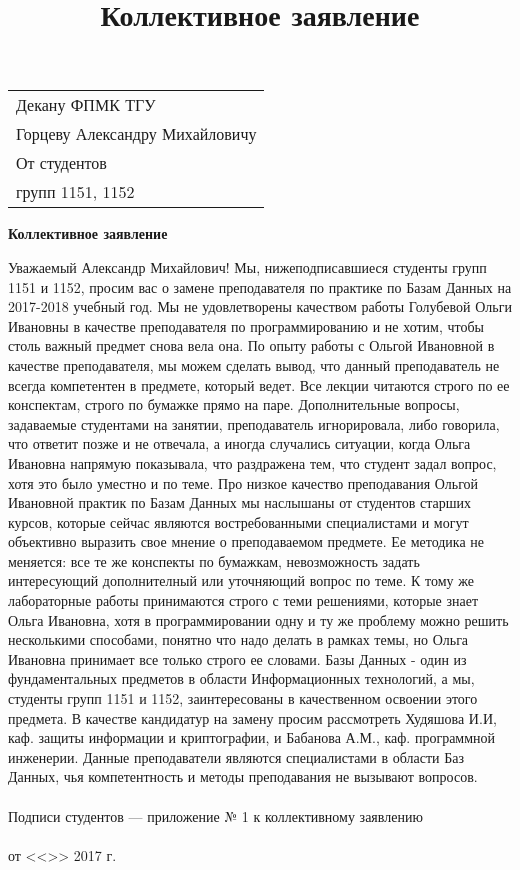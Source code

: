 \documentclass[a4paper,12pt]{extarticle}
\title{Коллективное заявление}
\begin{document}
	\pagestyle{empty}

	\begin{flushright}
		\begin{tabular}{l}
			Декану ФПМК ТГУ \\
			Горцеву Александру Михайловичу \\
			От студентов \\
			групп 1151, 1152
		\end{tabular}
	\end{flushright}


	\vspace{3cm}

	\centerline{\large \bf Коллективное заявление}

	\vspace{1cm}	

	Уважаемый Александр Михайлович!
	Мы, нижеподписавшиеся студенты групп 1151 и 1152, просим вас о замене преподавателя по практике по Базам Данных на 2017-2018 учебный год. Мы не удовлетворены качеством работы Голубевой Ольги Ивановны в качестве преподавателя по программированию и не хотим, чтобы столь важный предмет снова вела она. По опыту работы с Ольгой Ивановной в качестве преподавателя, мы можем сделать вывод, что данный преподаватель не всегда компетентен в предмете, который ведет. Все лекции читаются строго по ее конспектам, строго по бумажке прямо на паре. Дополнительные вопросы, задаваемые студентами на занятии, преподаватель игнорировала, либо говорила, что ответит позже и не отвечала, а иногда случались ситуации, когда Ольга Ивановна напрямую показывала, что раздражена тем, что студент задал вопрос, хотя это было уместно и по теме. Про низкое качество преподавания Ольгой Ивановной практик по Базам Данных мы наслышаны от студентов старших курсов, которые сейчас являются востребованными специалистами и могут объективно выразить свое мнение о преподаваемом предмете. Ее методика не меняется: все те же конспекты по бумажкам, невозможность задать интересующий дополнителный или уточняющий вопрос по теме. К тому же лабораторные работы принимаются строго с теми решениями, которые знает Ольга Ивановна, хотя в программировании одну и ту же проблему можно решить несколькими способами, понятно что надо делать в рамках темы, но Ольга Ивановна принимает все только строго ее словами. Базы Данных - один из фундаментальных предметов в области Информационных технологий, а мы, студенты групп 1151 и 1152, заинтересованы в качественном освоении этого предмета. В качестве кандидатур на замену просим рассмотреть Худяшова И.И, каф. защиты информации и криптографии, и Бабанова А.М., каф. программной инженерии. Данные преподаватели являются специалистами в области Баз Данных, чья компетентность и методы преподавания не вызывают вопросов.
	\\\\
	Подписи студентов --- приложение № 1 к коллективному заявлению
	\\\\
	от <<\makebox[0.75cm]{\hrulefill}>> \makebox[2cm]{\hrulefill} 2017 г.
\end{document}
